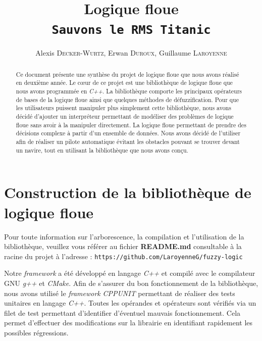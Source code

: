 \documentclass[a4paper,11pt]{article}
\title{\vspace*{3cm}Logique floue\\\texttt{Sauvons le RMS Titanic}}
\author{Alexis \textsc{Decker-Wurtz}, Erwan  \textsc{Duroux}, Guillaume  \textsc{Laroyenne}}
\begin{document}
    \maketitle

    \begin{abstract}


        \vspace*{2cm}

        Ce document présente une synthèse du projet de logique floue que nous avons réalisé en deuxième année.
        Le cœur de ce projet est une bibliothèque de logique floue que nous avons programmée en \textit{C++}. La bibliothèque comporte les principaux opérateurs de bases de la logique floue ainsi que quelques méthodes de défuzzification.
        Pour que les utilisateurs puissent manipuler plus simplement cette bibliothèque, nous avons décidé d'ajouter un interpréteur permettant de modéliser des problèmes de logique floue sans avoir à la manipuler directement.
        La logique floue permettant de prendre des décisions complexe à partir d'un ensemble de données. Nous avons décidé de l'utiliser afin de réaliser un pilote automatique évitant les obstacles pouvant se trouver devant un navire, tout en utilisant la bibliothèque que nous avons conçu.
    \end{abstract}

    \newpage

    \section{Construction de la bibliothèque de logique floue}

    \begin{center}
        Pour toute information sur l'arborescence, la compilation et l'utilisation de la bibliothèque, veuillez vous référer au fichier \textbf{README.md} consultable à la racine du projet à l’adresse : \texttt{https://github.com/LaroyenneG/fuzzy-logic}
    \end{center}

    Notre \textit{framework} a été développé en langage \textit{C++} et compilé avec le compilateur GNU \textit{g++} et \textit{CMake}.
    Afin de s’assurer du bon fonctionnement de la bibliothèque, nous avons utilisé le \textit{framework} \textit{CPPUNIT} permettant de réaliser des tests unitaires en langage \textit{C++}.
    Toutes les opérandes et opérateurs sont vérifiés via un filet de test permettant d’identifier d’éventuel mauvais fonctionnement.
    Cela permet d'effectuer des modifications sur la librairie en identifiant rapidement les possibles régressions.
\end{document}
